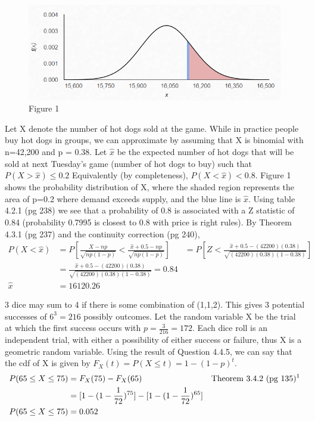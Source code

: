 \documentclass[12pt]{article}
\newenvironment{problem}[2][Problem]{\begin{trivlist}
\item[\hskip \labelsep {\bfseries #1}\hskip \labelsep {\bfseries #2.}]}{\end{trivlist}}
\begin{document}
\begin{problem}{4.3.14}
\begin{figure}
  \includegraphics[width=\linewidth]{4-3-14.png}
  \caption{Figure 1}
  \label{fig:boat1}
\end{figure}
Let X denote the number of hot dogs sold at the game.  While in practice people buy hot dogs in groups, we can approximate by assuming that X is binomial with n=42,200 and p = 0.38.  Let $\hat{x}$ be the expected number of hot dogs that will be sold at next Tuesday's game (number of hot dogs to buy) such that $P(X>\hat{x}) \leq 0.2$ Equivalently (by completeness),   $P(X<\hat{x}) < 0.8$. Figure 1 shows the probability distribution of X, where the shaded region represents the area of p=0.2 where demand exceeds supply, and the blue line is $\hat{x}$. Using table 4.2.1 (pg 238) we see that a probability of 0.8 is associated with a Z statistic of 0.84 (probability 0.7995 is closest to 0.8 with price is right rules). By Theorem 4.3.1 (pg 237) and the continuity correction (pg 240), 
\begin{align*}
P(X<\hat{x}) &= P[\frac{X-np}{\sqrt{np(1-p)}} < \frac{\hat{x}+0.5 -np}{\sqrt{np(1-p)}}]
&= P[Z < \frac{\hat{x}+0.5 -(42200)(0.38)}{\sqrt{(42200)(0.38)(1-0.38)}}] \\
&=  \frac{\hat{x}+0.5 -(42200)(0.38)}{\sqrt{(42200)(0.38)(1-0.38)}} = 0.84 \\
\hat{x} &= 16120.26
\end{align*}
\end{problem}

\begin{problem}{4.4.6} 
3 dice may sum to 4 if there is some combination of (1,1,2). This gives 3 potential successes of $6^3 = 216$ possibly outcomes. Let the random variable X be the trial at which the first success occurs with $p = \frac{3}{216}={1}{72}$. Each dice roll is an independent trial, with either a possibility of either success or failure, thus X is a geometric random variable. Using the result of Question 4.4.5, we can say that the cdf of X is given by $F_X(t) = P(X \leq t) = 1 - (1-p)^t$. 
\begin{align*} 
P(65\leq X \leq 75) &= F_X(75)-F_X(65) && \text{Theorem 3.4.2 (pg 135)\footnotemark} \\
&= [1-(1-\frac{1}{72})^{75}] - [1-(1-\frac{1}{72})^{65}] \\
P(65\leq X \leq 75) &=0.052
\end{align*}
\end{problem}
\end{document}
